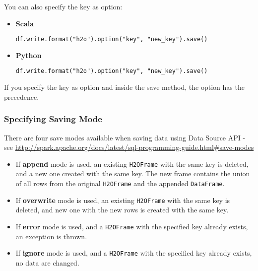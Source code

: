 \documentclass{standalone}
\begin{document}
    You can also specify the key as option:

    \begin{itemize}
        \item \textbf{Scala} \begin{lstlisting}[style=Scala]
df.write.format("h2o").option("key", "new_key").save()
        \end{lstlisting}
        \item \textbf{Python} \begin{lstlisting}[style=Python]
df.write.format("h2o").option("key", "new_key").save()
        \end{lstlisting}
    \end{itemize}

    If you specify the key as option and inside the save method, the option
    has the precedence.

    \subsubsection{Specifying Saving Mode}

    There are four save modes available when saving data using Data Source
    API - see \url{http://spark.apache.org/docs/latest/sql-programming-guide.html#save-modes}

    \begin{itemize}
        \item If \textbf{append} mode is used, an existing \texttt{H2OFrame} with the same key is deleted, and a new one created with the same key. The new frame contains the union of all rows from the original \texttt{H2OFrame} and the appended \texttt{DataFrame}.
        \item If \textbf{overwrite} mode is used, an existing \texttt{H2OFrame} with the same key is deleted, and new one with the new rows is created with the same key.
        \item If \textbf{error} mode is used, and a \texttt{H2OFrame} with the specified key already exists, an exception is thrown.
        \item If \textbf{ignore} mode is used, and a \texttt{H2OFrame} with the specified key already exists, no data are changed.
    \end{itemize}
\end{document}
